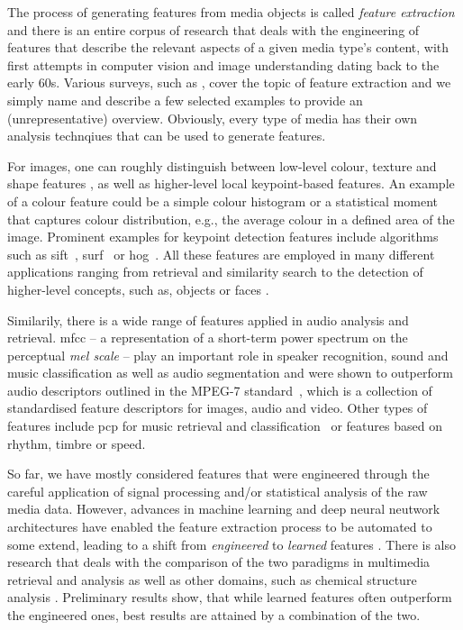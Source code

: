 The process of generating features from media objects is called \emph{feature extraction} \cite{Blanken:2007multimedia} and there is an entire corpus of research that deals with the engineering of features that describe the relevant aspects of a given media type's content, with first attempts in computer vision and image understanding dating back to the early 60s. Various surveys, such as \cite{McKinney:2003Features,Ding:2012ASurvey,Salau:2019Feature}, cover the topic of feature extraction and we simply name and describe a few selected examples to provide an (unrepresentative) overview. Obviously, every type of media has their own analysis technqiues that can be used to generate features.

For images, one can roughly distinguish between low-level colour, texture and shape features \cite{Salau:2019Feature}, as well as higher-level local keypoint-based features. An example of a colour feature could be a simple colour histogram or a statistical moment that captures colour distribution, e.g., the average colour in a defined area of the image. Prominent examples for keypoint detection features include algorithms such as \acrfull{sift}~\cite{Lowe:1999object}, \acrfull{surf}~\cite{Bay:2006surf} or \acrfull{hog}~\cite{Dalal:2005Histograms}. All these features are employed in many different applications ranging from retrieval and similarity search to the detection of higher-level concepts, such as, objects or faces \cite{Deniz:2011Face, Farooq:2016Object}.

Similarily, there is a wide range of features applied in audio analysis and retrieval. \acrfull{mfcc} -- a representation of a short-term power spectrum on the perceptual \emph{mel scale} -- play an important role in speaker recognition, sound and music classification as well as audio segmentation \cite{Kim:2010Comparison} and were shown to outperform audio descriptors outlined in the MPEG-7 standard~\cite{Quackenbush:2001Overview}, which is a collection of standardised feature descriptors for images, audio and video. Other types of features include \acrfull{pcp} for music retrieval and classification~\cite{Lee:2006Automatic,Demirel:2019Automatic} or features based on rhythm, timbre or speed. 

So far, we have mostly considered features that were engineered through the careful application of signal processing and/or statistical analysis of the raw media data. However, advances in machine learning and deep neural neutwork architectures have enabled the feature extraction process to be automated to some extend, leading to a shift from  \emph{engineered} to \emph{learned} features \cite{Hamel:2010Learning,Gordo:2016Deep}. There is also research that deals with the comparison of the two paradigms in multimedia retrieval and analysis \cite{Budnik:2017learned} as well as other domains, such as chemical structure analysis \cite{Gallegos:2021importance}. Preliminary results show, that while learned features often outperform the engineered ones, best results are attained by a combination of the two.

